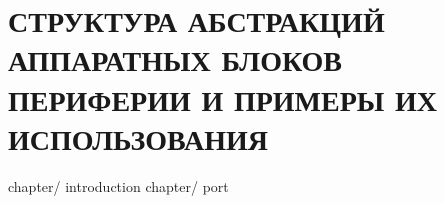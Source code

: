 \part{СТРУКТУРА АБСТРАКЦИЙ АППАРАТНЫХ БЛОКОВ ПЕРИФЕРИИ И ПРИМЕРЫ ИХ ИСПОЛЬЗОВАНИЯ}\label{module:op}
		
	{chapter/}	{introduction}					%
	{chapter/}	{port}							%